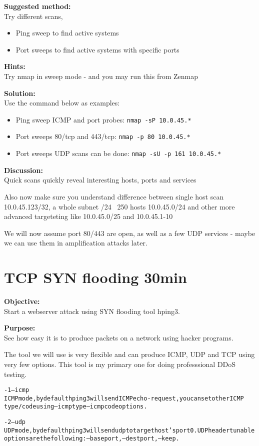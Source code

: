 \documentclass[a4paper,11pt,notitlepage]{report}
\begin{document}
{\bf Suggested method:}\\
Try different scans,
\begin{itemize}
\item Ping sweep to find active systems
\item Port sweeps to find active systems with specific ports
\end{itemize}

{\bf Hints:} \\
Try nmap in sweep mode - and you may run this from Zenmap

{\bf Solution:}\\
Use the command below as examples:
\begin{itemize}
\item Ping sweep ICMP and port probes: \verb+nmap -sP 10.0.45.*+
\item Port sweeps 80/tcp and 443/tcp: \verb+nmap -p 80 10.0.45.*+
\item Port sweeps UDP scans can be done: \verb+nmap -sU -p 161 10.0.45.*+
\end{itemize}

{\bf Discussion:}\\
Quick scans quickly reveal interesting hosts, ports and services

Also now make sure you understand difference between single host scan
10.0.45.123/32, a whole subnet /24 ~250 hosts 10.0.45.0/24 and other more advanced targeteting like 10.0.45.0/25 and 10.0.45.1-10

We will now assume port 80/443 are open, as well as a few UDP services - maybe we can use them in amplification attacks later.

\chapter{TCP SYN flooding 30min}
\label{ex:syn-flood}

{\bf Objective:}\\
Start a webserver attack using SYN flooding tool hping3.

{\bf Purpose:}\\
See how easy it is to produce packets on a network using hacker programs.

The tool we will use is very flexible and can produce ICMP, UDP and TCP using very few options. This tool is my primary one for doing professsional DDoS testing.

\begin{alltt}\footnotesize
-1 --icmp
       ICMP  mode,  by  default  hping3  will  send  ICMP echo-request, you can set other ICMP
       type/code using --icmptype --icmpcode options.

-2 --udp
       UDP mode, by default hping3 will send udp to target host's port 0.  UDP header  tunable
       options are the following: --baseport, --destport, --keep.
\end{alltt}
\end{document}
